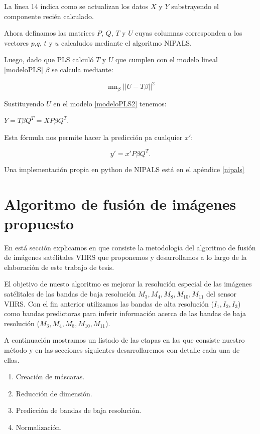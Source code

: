 La línea 14 índica como se actualizan los datos $X$ y $Y$ substrayendo el componente recién calculado.

Ahora definamos las matrices $P$, $Q$, $T$ y $U$ cuyas columnas corresponden a los vectores $p$,$q$, $t$ y $u$ calcaludos mediante el algoritmo NIPALS. 

Luego, dado que PLS calculó $T$ y $U$ que cumplen con el modelo lineal \ref{modeloPLS} $\beta$ se calcula mediante: 

\begin{equation}
\mathop{m\acute{i}n}_{\beta} ||U-T\beta||^{2}
\end{equation}

Sustituyendo $U$ en el modelo \ref{modeloPLS2} tenemos: 

\begin{center}
$Y = T \beta Q^{T} = XP\beta Q^{T}$.
\end{center}

Esta fórmula nos permite hacer la predicción pa cualquier $x'$: 

\begin{equation}\label{regresionPLS}
y' = x'P\beta Q^{T}.
\end{equation}

Una implementación propia en python de NIPALS está en el apéndice \ref{nipals}

\section{Algoritmo de fusión de imágenes propuesto}

En está sección explicamos en que consiste la metodología del algoritmo de fusión de imágenes satélitales VIIRS que proponemos y desarrollamos a lo largo de la elaboración de este trabajo de tesis.

El objetivo de nuesto algoritmo es mejorar la resolución especial de las imágenes satélitales de las bandas de baja resolución $M_{3}, M_{4}, M_{8}, M_{10}, M_{11}$ del sensor VIIRS. Con el fin anterior utilizamos las bandas de alta resolución ($I_{1}, I_{2}, I_{3}$) como bandas predictoras para inferir información acerca de las bandas de baja resolución ($M_{3}, M_{4}, M_{8}, M_{10}, M_{11}$). 

A continuación mostramos un listado de las etapas en las que consiste nuestro método y en las secciones siguientes desarrollaremos con detalle cada una de ellas. 

\begin{enumerate}
\item Creación de máscaras.
\item Reducción de dimensión.	 
\item Predicción de bandas de baja resolución. 
\item Normalización.
\end{enumerate}



